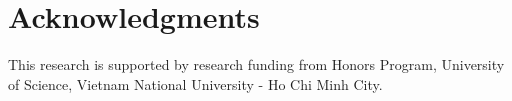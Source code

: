 \section*{Acknowledgments}
This research is supported by research funding from Honors Program, University of Science, Vietnam National University - Ho Chi Minh City.
